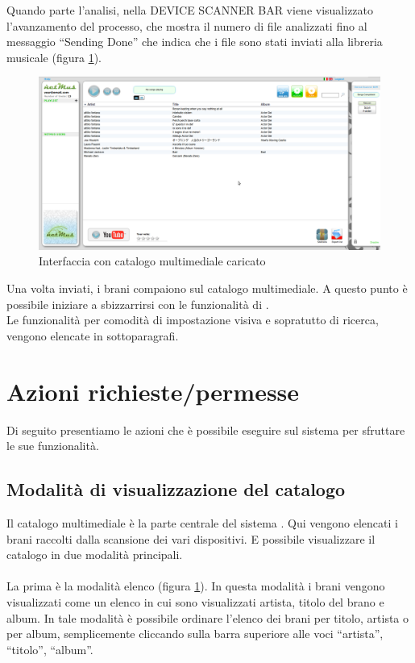 Quando parte l'analisi, nella DEVICE SCANNER BAR viene visualizzato
l'avanzamento del processo, che mostra il numero di file analizzati fino al
messaggio ``Sending Done'' che indica che i file sono stati inviati alla
libreria musicale (figura \ref{fig:fineUpload}).

\newpage
\begin{figure}[!htbp]
  \centering
  \includegraphics[width=14cm]{img/MU/song_loaded.png}
\caption{Interfaccia con catalogo multimediale caricato}
\label{fig:fineUpload}
\end{figure}
\vspace{1cm}

Una volta inviati, i brani compaiono sul catalogo multimediale.
A questo punto \`e possibile iniziare a sbizzarrirsi con le funzionalit\`a di
.\\

Le funzionalit\`a per comodit\`a di impostazione visiva e
sopratutto di ricerca, vengono elencate in sottoparagrafi.

\newpage
\section{Azioni richieste/permesse}
Di seguito presentiamo le azioni che \`e possibile eseguire sul sistema per
sfruttare le sue funzionalit\`a.

\subsection{Modalit\`a di visualizzazione del catalogo}
Il catalogo multimediale \`e la parte centrale del sistema . Qui
vengono elencati i brani raccolti dalla scansione dei vari dispositivi. E
possibile visualizzare il catalogo in due modalit\`a principali.\\
\\
La prima \`e la modalit\`a elenco (figura \ref{fig:fineUpload}). In questa
modalit\`a i brani vengono visualizzati come un elenco in cui sono visualizzati artista, titolo del brano e
album. In tale modalit\`a \`e possibile ordinare l'elenco dei brani per titolo,
artista o per album, semplicemente cliccando sulla barra superiore alle voci
``artista'', ``titolo'', ``album''.\\

